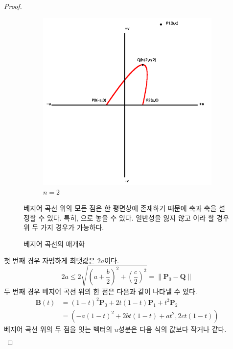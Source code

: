 \documentclass{gshs_thesis}
\theoremstyle{theorem}
\theoremstyle{lemma}
\theoremstyle{definition}
\begin{document}
\begin{proof}
\begin{figure}[h]
\begin{center}
\begin{subfigure}{.4\textwidth}
				\includegraphics[width=\textwidth]{image/BCcase2}
				\caption{$n=2$}
			\end{subfigure}
		\end{center} 
        \caption{베지어 곡선의 매개화}
		\raggedright \small  베지어 곡선 위의 모든 점은 한 평면상에 존재하기 때문에 축과 축을 설정할 수 있다. 특히, 으로 놓을 수 있다. 일반성을 잃지 않고 이라 할 경우 위 두 가지 경우가 가능하다.
	\end{figure}
	첫 번째 경우 자명하게 최댓값은 $2a$이다.
	\begin{equation}
		2a\leq2\sqrt{{\left(a+\frac{b}{2}\right)^{2}}+{\left(\frac{c}{2}\right)^{2}}}=\parallel\textbf{P}_{0}-\textbf{Q}\parallel
	\end{equation}
	두 번째 경우 베지어 곡선 위의 한 점은 다음과 같이 나타낼 수 있다. 
	\begin{equation}
		\begin{split}
		\textbf{B}(t)&=(1-t)^{2}\textbf{P}_{0}+2t(1-t)\textbf{P}_{1}+t^{2}\textbf{P}_{2} \\
		&=(-a(1-t)^{2}+2bt(1-t)+at^{2},2ct(1-t))
		\end{split}
	\end{equation}
	베지어 곡선 위의 두 점을 잇는 벡터의 $u$성분은 다음 식의 값보다 작거나 같다.
	\begin{equation}
		\begin{split}

\end{split}
\end{equation}
\end{proof}
\end{document}
